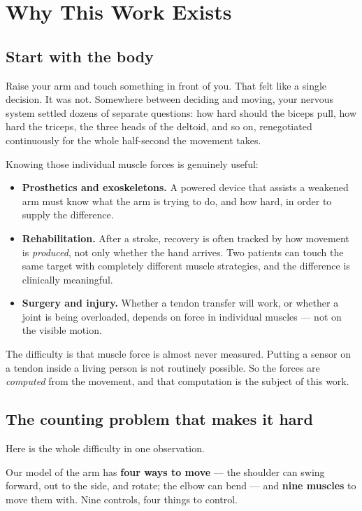 \chapter{Why This Work Exists}

\section{Start with the body}

Raise your arm and touch something in front of you. That felt like a single
decision. It was not. Somewhere between deciding and moving, your nervous system
settled dozens of separate questions: how hard should the biceps pull, how hard
the triceps, the three heads of the deltoid, and so on, renegotiated continuously
for the whole half-second the movement takes.

Knowing those individual muscle forces is genuinely useful:

\begin{itemize}[leftmargin=1.4em, itemsep=3pt]
\item \textbf{Prosthetics and exoskeletons.} A powered device that assists a
weakened arm must know what the arm is trying to do, and how hard, in order to
supply the difference.
\item \textbf{Rehabilitation.} After a stroke, recovery is often tracked by how
movement is \emph{produced}, not only whether the hand arrives. Two patients can
touch the same target with completely different muscle strategies, and the
difference is clinically meaningful.
\item \textbf{Surgery and injury.} Whether a tendon transfer will work, or
whether a joint is being overloaded, depends on force in individual muscles ---
not on the visible motion.
\end{itemize}

The difficulty is that muscle force is almost never measured. Putting a sensor on
a tendon inside a living person is not routinely possible. So the forces are
\emph{computed} from the movement, and that computation is the subject of this
work.

\section{The counting problem that makes it hard}

Here is the whole difficulty in one observation.

Our model of the arm has \textbf{four ways to move} --- the shoulder can swing
forward, out to the side, and rotate; the elbow can bend --- and \textbf{nine
muscles} to move them with. Nine controls, four things to control.

